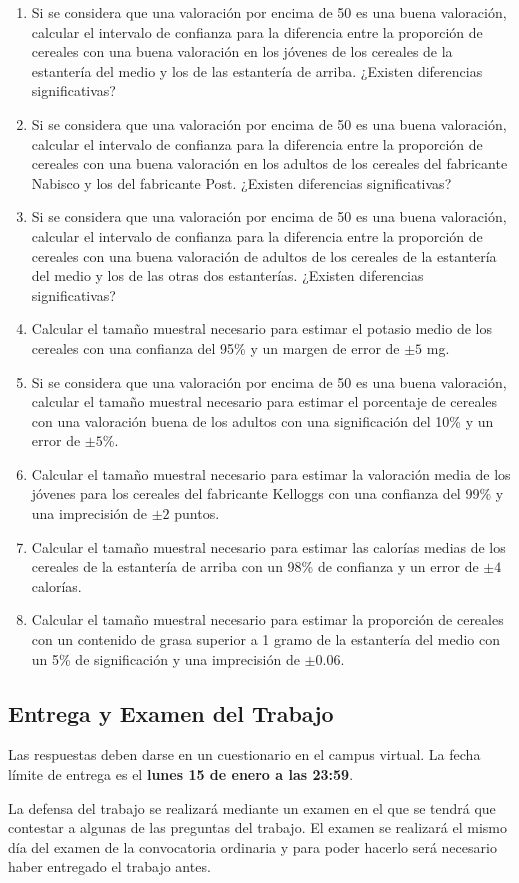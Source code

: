 \documentclass[a4paper,titlepage]{article}
\begin{document}
\begin{enumerate}[leftmargin=*]
\item Si se considera que una valoración por encima de 50 es una buena valoración, calcular el intervalo de confianza para la diferencia entre la proporción de cereales con una buena valoración en los jóvenes de los cereales de la estantería del medio y los de las estantería de arriba. ¿Existen diferencias significativas?
\item Si se considera que una valoración por encima de 50 es una buena valoración, calcular el intervalo de confianza para la diferencia entre la proporción de cereales con una buena valoración en los adultos de los cereales del fabricante Nabisco y los del fabricante Post. ¿Existen diferencias significativas?
\item Si se considera que una valoración por encima de 50 es una buena valoración, calcular el intervalo de confianza para la diferencia entre la proporción de cereales con una buena valoración de adultos de los cereales de la estantería del medio y los de las otras dos estanterías. ¿Existen diferencias significativas?
\item Calcular el tamaño muestral necesario para estimar el potasio medio de los cereales con una confianza del 95\% y un margen de error de $\pm 5$ mg.
\item Si se considera que una valoración por encima de 50 es una buena valoración, calcular el tamaño muestral necesario para estimar el porcentaje de cereales con una valoración buena de los adultos con una significación del 10\% y un error de $\pm 5$\%.
\item Calcular el tamaño muestral necesario para estimar la valoración media de los jóvenes para los cereales del fabricante Kelloggs con una confianza del 99\% y una imprecisión de $\pm 2$ puntos.
\item Calcular el tamaño muestral necesario para estimar las calorías medias de los cereales de la estantería de arriba con un 98\% de confianza y un error de $\pm 4$ calorías.
\item Calcular el tamaño muestral necesario para estimar la proporción de cereales con un contenido de grasa superior a 1 gramo de la estantería del medio con un 5\% de significación y una imprecisión de $\pm 0.06$.
\end{enumerate}

\subsection*{\color{blueceu}Entrega y Examen del Trabajo}
Las respuestas deben darse en un cuestionario en el campus virtual. La fecha límite de entrega es el \textbf{lunes 15 de enero a las 23:59}.

La defensa del trabajo se realizará mediante un examen en el que se tendrá que contestar a algunas de las preguntas del trabajo. El examen se realizará el mismo día del examen de la convocatoria ordinaria y para poder hacerlo será necesario haber entregado el trabajo antes.
\end{document}
